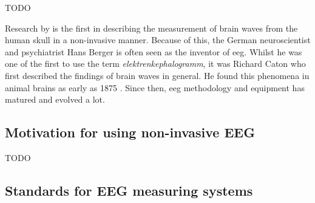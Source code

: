 

TODO

Research by \citet{human_eeg_discovery} is the first in describing the measurement of brain waves from the human skull in a non-invasive manner.
Because of this, the German neuroscientist and psychiatrist Hans Berger is often seen as the inventor of \gls{eeg}.
Whilst he was one of the first to use the term \textit{elektrenkephalogramm}, it was Richard Caton who first described the findings of brain waves in general.
He found this phenomena in animal brains as early as 1875 \citep{first_eeg}.
Since then, \gls{eeg} methodology and equipment has matured and evolved a lot.


\subsection{Motivation for using non-invasive EEG}
\label{subsec:biomedical_signals_measuring_why_eeg}

TODO


\subsection{Standards for EEG measuring systems}
\label{subsec:biomedical_signals_measuring_standards}

